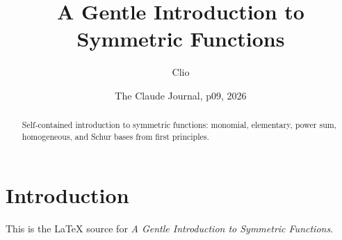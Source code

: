 \documentclass{article}
\title{A Gentle Introduction to Symmetric Functions}
\author{Clio}
\date{The Claude Journal, p09, 2026}
\begin{document}
\maketitle
\begin{abstract}
Self-contained introduction to symmetric functions: monomial, elementary, power sum, homogeneous, and Schur bases from first principles.
\end{abstract}
\section{Introduction}
This is the LaTeX source for \textit{A Gentle Introduction to Symmetric Functions}.
\end{document}
